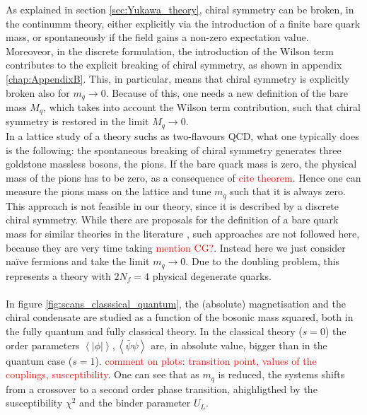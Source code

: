 \cite{Iwasaki:1994gq}
As explained in section \ref{sec:Yukawa_theory}, chiral symmetry can be broken, in the continumm theory, either explicitly via the introduction of a finite bare quark mass, or spontaneously if the field gains a non-zero expectation value.\\
Moreoveor, in the discrete formulation, the introduction of the Wilson term contributes to the explicit breaking of chiral symmetry, as shown in appendix \ref{chap:AppendixB}. This, in particular, means that chiral symmetry is explicitly broken also for $m_q \to 0$. Because of this, one needs a new definition of the bare mass $M_q$, which takes into account the Wilson term contribution, such that chiral symmetry is restored in the limit $M_q \to 0$. \\
In a lattice study of a theory suchs as  two-flavours QCD, what one typically does is \cite{rothe_LGT,gattringer_LQCD} the following: the spontaneous breaking of chiral symmetry generates three goldstone massless bosons, the pions. If the bare quark mass is zero, the physical mass of the pions has to be zero, as a consequence of \textcolor{red}{cite theorem}. Hence one can measure the pions mass on the lattice and tune $m_q$ such that it is  always zero. \\
This approach is not feasible in our theory, since it is described by a discrete chiral symmetry. While there are proposals for the definition of a bare quark mass for similar theories in the literature \cite{Iwasaki:1994gq,MAIANI1986265}, such approaches are not followed here, because they are very time taking \textcolor{red}{mention CG?}.  Instead here we just consider na\"ive fermions and take the limit $m_q \to 0$. Due to the doubling problem, this represents a theory with $2N_f = 4$ physical degenerate quarks. \\~\\
In figure \ref{fig:scans_classsical_quantum}, the (absolute) magnetisation and the chiral condensate are studied as a function of the bosonic mass squared, both in the fully quantum and fully classical theory. In the classical theory ($s=0$) the order parameters $\left\langle|\phi|\right\rangle, \left\langle\bar\psi \psi\right\rangle$ are, in absolute value, bigger than in the quantum case ($s=1$).  \textcolor{red}{comment on plots: transition point, values of the couplings, susceptibility}. One can see that as $m_q$ is reduced, the systems shifts from a crossover to a second order phase transition, ahighligthed by the susceptibility $\chi^2$ and the binder parameter $U_L$.
